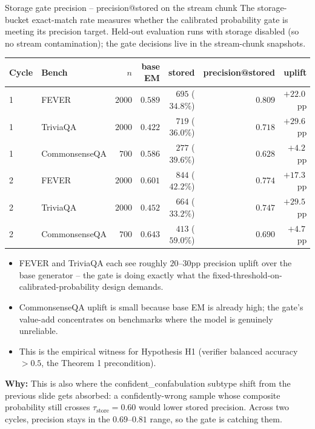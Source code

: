 \documentclass[10pt,aspectratio=169]{beamer}
\newcommand{\why}[1]{{\color{caemamber}\textbf{Why:}} #1}
\begin{document}
\begin{frame}{Storage gate precision -- precision@stored on the stream chunk}
  \scriptsize
  The storage-bucket exact-match rate measures whether the calibrated probability gate is meeting its precision target. Held-out evaluation runs with storage disabled (so no stream contamination); the gate decisions live in the stream-chunk snapshots.

  \vspace{0.3em}
  \begin{tabular}{@{}llrrrrr@{}}
    \toprule
    \textbf{Cycle} & \textbf{Bench} & \textbf{$n$} & \textbf{base EM} & \textbf{stored} & \textbf{precision@stored} & \textbf{uplift} \\
    \midrule
    1 & FEVER         & $2000$ & $0.589$ & $695$ ($34.8\%$) & $\mathbf{0.809}$ & $+22.0\,$pp \\
    1 & TriviaQA      & $2000$ & $0.422$ & $719$ ($36.0\%$) & $\mathbf{0.718}$ & $+29.6\,$pp \\
    1 & CommonsenseQA & $700$  & $0.586$ & $277$ ($39.6\%$) & $0.628$ & $+4.2\,$pp \\
    \midrule
    2 & FEVER         & $2000$ & $0.601$ & $844$ ($42.2\%$) & $\mathbf{0.774}$ & $+17.3\,$pp \\
    2 & TriviaQA      & $2000$ & $0.452$ & $664$ ($33.2\%$) & $\mathbf{0.747}$ & $+29.5\,$pp \\
    2 & CommonsenseQA & $700$  & $0.643$ & $413$ ($59.0\%$) & $0.690$ & $+4.7\,$pp \\
    \bottomrule
  \end{tabular}

  \vspace{0.3em}
  \begin{itemize}\scriptsize
    \item FEVER and TriviaQA each see roughly $20$--$30$pp precision uplift over the base generator -- the gate is doing exactly what the fixed-threshold-on-calibrated-probability design demands.
    \item CommonsenseQA uplift is small because base EM is already high; the gate's value-add concentrates on benchmarks where the model is genuinely unreliable.
    \item This is the empirical witness for Hypothesis H1 (verifier balanced accuracy $> 0.5$, the Theorem 1 precondition).
  \end{itemize}

  \why{This is also where the confident\_confabulation subtype shift from the previous slide gets absorbed: a confidently-wrong sample whose composite probability still crosses $\tau_{\text{store}}=0.60$ would lower stored precision. Across two cycles, precision stays in the $0.69$--$0.81$ range, so the gate is catching them.}
\end{frame}
\end{document}
